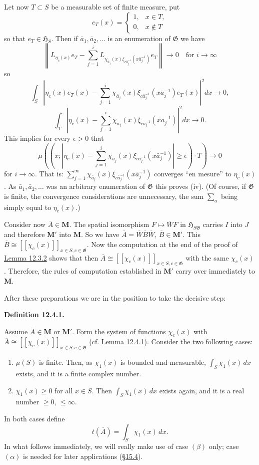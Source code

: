 \documentclass[12pt,b5paper,twoside]{article}
\newcommand{\Hspace}{\mathfrak H}
\newcommand{\M}{\mathbf M}
\newcommand{\Definition}[1]{%
  \par\smallskip\noindent\phantomsection\label{def:#1}\textbf{Definition #1.}\enspace
}
\newcommand{\secref}[1]{\hyperref[sec:#1]{\S#1}}
\newcommand{\lemref}[1]{\hyperref[lem:#1]{Lemma #1}}
\begin{document}
Let now $T\subset S$ be a measurable set of finite measure, put
\[
 e_T(x)=\begin{cases}
  1,&x\in T,\\
  0,&x\notin T
 \end{cases}
\]
so that $e_T\in\Hspace_S$. Then if $\bar a_1,\bar a_2,\ldots$ is an
enumeration of $\mathfrak G$ we have
\[
 \left\lVert L_{\eta_c(x)}e_T
 -\sum_{j=1}^i
 L_{\chi_{\bar a_j}(x)
       \xi_{c\bar a_j^{-1}}(x\bar a_j^{-1})}e_T
 \right\rVert\longrightarrow0
 \quad\text{for }i\to\infty
\]
so
\[
 \int_S\left|\eta_c(x)e_T(x)
 -\sum_{j=1}^i\chi_{\bar a_j}(x)
 \xi_{c\bar a_j^{-1}}(x\bar a_j^{-1})e_T(x)\right|^2dx\longrightarrow0,
\]
\[
 \int_T\left|\eta_c(x)
 -\sum_{j=1}^i\chi_{\bar a_j}(x)
 \xi_{c\bar a_j^{-1}}(x\bar a_j^{-1})\right|^2dx\longrightarrow0.
\]
This implies for every $\epsilon>0$ that
\[
 \mu\left((x;\left|\eta_c(x)-
 \sum_{j=1}^i\chi_{\bar a_j}(x)
 \xi_{c\bar a_j^{-1}}(x\bar a_j^{-1})\right|\geq\epsilon)\cdot T\right)
 \longrightarrow0
\]
for $i\to\infty$. That is:
$\sum_{j=1}^\infty\chi_{\bar a_j}(x)
\xi_{c\bar a_j^{-1}}(x\bar a_j^{-1})$ converges ``en mesure'' to
$\eta_c(x)$. As $\bar a_1,\bar a_2,\ldots$ was an arbitrary enumeration of
$\mathfrak G$ this proves (iv). (Of course, if $\mathfrak G$ is finite, the
convergence considerations are unnecessary, the sum $\sum_a$ being simply
equal to $\eta_c(x)$.)

Consider now $\overline A\in\M$. The spatial isomorphism
$F\mapsto\overline WF$ in $\Hspace_{S\mathfrak G}$ carries $I$ into $J$ and
therefore $\M'$ into $\M$. So we have
$\overline A=\overline W\overline B\overline W$, $\overline B\in\M'$. This
$\overline B\cong[[\chi_c(x)]]_{x\in S,c\in\mathfrak G}$. Now the computation
at the end of the proof of \lemref{12.3.2} shows that then
$\overline A\cong[[\chi_c(x)]]_{x\in S,c\in\mathfrak G}$ with the same
$\chi_c(x)$. Therefore, the rules of computation established in $\M'$ carry
over immediately to $\M$.

After these preparations we are in the position to take the decisive step:

\Definition{12.4.1}
Assume $\overline A\in\M$ or $\M'$. Form the system of functions $\chi_c(x)$
with $\overline A\cong[[\chi_c(x)]]_{x\in S,c\in\mathfrak G}$
(cf. \lemref{12.4.1}). Consider the two following cases:
\begin{enumerate}[leftmargin=2.4em]
\item[$(\alpha)$] $\mu(S)$ is finite. Then, as $\chi_1(x)$ is bounded and measurable,
  $\int_S\chi_1(x)\,dx$ exists, and it is a finite complex number.
\item[$(\beta)$] $\chi_1(x)\geq0$ for all $x\in S$. Then
  $\int_S\chi_1(x)\,dx$ exists again, and it is a real number $\geq0$,
  $\leq\infty$.
\end{enumerate}
In both cases define
\[
 t(\overline A)=\int_S\chi_1(x)\,dx.
\]
In what follows immediately, we will really make use of case $(\beta)$ only;
case $(\alpha)$ is needed for later applications (\secref{15.4}).
\end{document}
